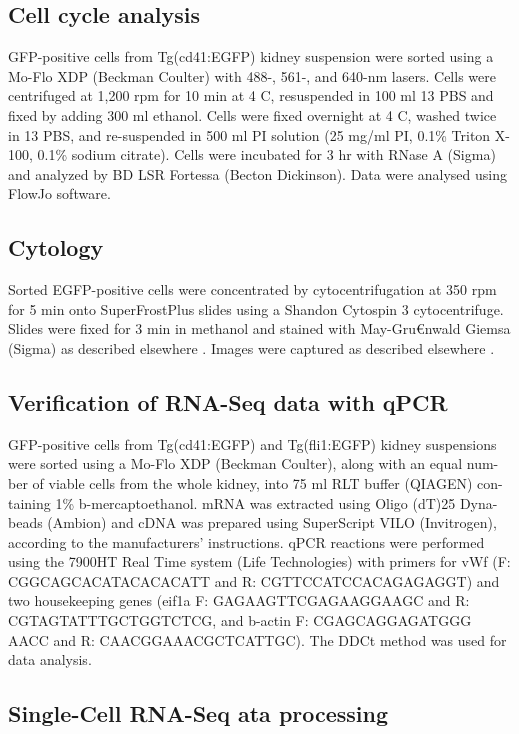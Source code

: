 \subsection{Cell cycle analysis}

GFP-positive cells from Tg(cd41:EGFP) kidney suspension were sorted using a Mo-Flo XDP (Beckman Coulter) with 488-, 561-, and 640-nm lasers. Cells were centrifuged at 1,200 rpm for 10 min at 4 C, resuspended in 100 ml 13 PBS and fixed by adding 300 ml ethanol. Cells were fixed overnight at 4 C, washed twice in 13 PBS, and re-suspended in 500 ml PI solution (25 mg/ml PI, 0.1\% Triton X-100, 0.1\% sodium citrate). Cells were incubated for 3 hr with RNase A (Sigma) and analyzed by BD LSR Fortessa (Becton Dickinson). Data were analysed using FlowJo software.

\subsection{Cytology}

Sorted EGFP-positive cells were concentrated by cytocentrifugation at 350 rpm for 5 min onto SuperFrostPlus slides using a Shandon Cytospin 3 cytocentrifuge. Slides were fixed for 3 min in methanol and stained with May-Gru€nwald Giemsa (Sigma) as described elsewhere \cite{Stachura2009-gd}. Images were captured as described elsewhere \cite{Bielczyk-Maczynska2014-hf}.

\subsection{Verification of RNA-Seq data with qPCR}

GFP-positive cells from Tg(cd41:EGFP) and Tg(fli1:EGFP) kidney suspensions were sorted using a Mo-Flo XDP (Beckman Coulter), along with an equal num- ber of viable cells from the whole kidney, into 75 ml RLT buffer (QIAGEN) con- taining 1\% b-mercaptoethanol. mRNA was extracted using Oligo (dT)25 Dyna-beads (Ambion) and cDNA was prepared using SuperScript VILO (Invitrogen), according to the manufacturers’ instructions. qPCR reactions were performed using the 7900HT Real Time system (Life Technologies) with primers for vWf (F: CGGCAGCACATACACACATT and R: CGTTCCATCCACAGAGAGGT) and two housekeeping genes (eif1a F: GAGAAGTTCGAGAAGGAAGC and R: CGTAGTATTTGCTGGTCTCG, and b-actin F: CGAGCAGGAGATGGG AACC and R: CAACGGAAACGCTCATTGC). The DDCt method was used for data analysis.

\subsection{Single-Cell RNA-Seq ata processing}

